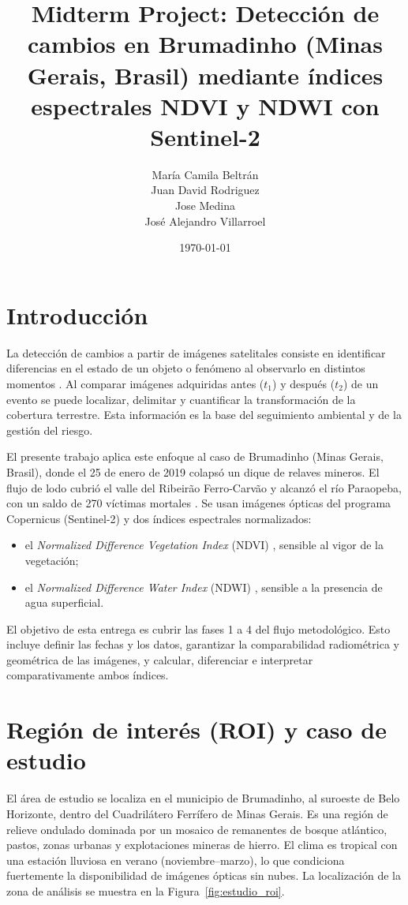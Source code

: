 \documentclass[12pt]{article}
\title{Midterm Project: Detección de cambios en Brumadinho (Minas Gerais, Brasil) mediante índices espectrales NDVI y NDWI con Sentinel-2}
\author{
María Camila Beltrán \\
Juan David Rodriguez \\
Jose Medina \\
José Alejandro Villarroel \\[0.4cm]
}
\date{\today}
\begin{document}
\maketitle

\section{Introducción}
La detección de cambios a partir de imágenes satelitales consiste en identificar diferencias en el estado de un objeto o fenómeno al observarlo en distintos momentos \parencite{Singh1989}. Al comparar imágenes adquiridas antes ($t_1$) y después ($t_2$) de un evento se puede localizar, delimitar y cuantificar la transformación de la cobertura terrestre. Esta información es la base del seguimiento ambiental y de la gestión del riesgo.

El presente trabajo aplica este enfoque al caso de Brumadinho (Minas Gerais, Brasil), donde el 25 de enero de 2019 colapsó un dique de relaves mineros. El flujo de lodo cubrió el valle del Ribeirão Ferro-Carvão y alcanzó el río Paraopeba, con un saldo de 270 víctimas mortales \parencite{Rotta2020}. Se usan imágenes ópticas del programa Copernicus (Sentinel-2) \parencite{Drusch2012} y dos índices espectrales normalizados:
\begin{itemize}
    \item el \emph{Normalized Difference Vegetation Index} (NDVI) \parencite{Rouse1974, Tucker1979}, sensible al vigor de la vegetación;
    \item el \emph{Normalized Difference Water Index} (NDWI) \parencite{McFeeters1996}, sensible a la presencia de agua superficial.
\end{itemize}

El objetivo de esta entrega es cubrir las fases 1 a 4 del flujo metodológico. Esto incluye definir las fechas y los datos, garantizar la comparabilidad radiométrica y geométrica de las imágenes, y calcular, diferenciar e interpretar comparativamente ambos índices.

\section{Región de interés (ROI) y caso de estudio}
El área de estudio se localiza en el municipio de Brumadinho, al suroeste de Belo Horizonte, dentro del Cuadrilátero Ferrífero de Minas Gerais. Es una región de relieve ondulado dominada por un mosaico de remanentes de bosque atlántico, pastos, zonas urbanas y explotaciones mineras de hierro. El clima es tropical con una estación lluviosa en verano (noviembre--marzo), lo que condiciona fuertemente la disponibilidad de imágenes ópticas sin nubes. La localización de la zona de análisis se muestra en la Figura~\ref{fig:estudio_roi}.
\end{document}
